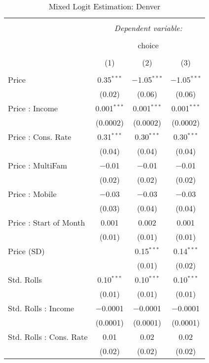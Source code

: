 
\begin{table}[!htbp] \centering 
  \caption{Mixed Logit Estimation: Denver} 
  \label{tab:mnlDenverRandCoef} 
\begin{tabular}{@{\extracolsep{5pt}}lccc} 
\\[-1.8ex]\hline 
\hline \\[-1.8ex] 
 & \multicolumn{3}{c}{\textit{Dependent variable:}} \\ 
\cline{2-4} 
\\[-1.8ex] & \multicolumn{3}{c}{choice} \\ 
\\[-1.8ex] & (1) & (2) & (3)\\ 
\hline \\[-1.8ex] 
 Price & 0.35$^{***}$ & $-$1.05$^{***}$ & $-$1.05$^{***}$ \\ 
  & (0.02) & (0.06) & (0.06) \\ 
  Price : Income & 0.001$^{***}$ & 0.001$^{***}$ & 0.001$^{***}$ \\ 
  & (0.0002) & (0.0002) & (0.0002) \\ 
  Price : Cons. Rate & 0.31$^{***}$ & 0.30$^{***}$ & 0.30$^{***}$ \\ 
  & (0.04) & (0.04) & (0.04) \\ 
  Price : MultiFam & $-$0.01 & $-$0.01 & $-$0.01 \\ 
  & (0.02) & (0.02) & (0.02) \\ 
  Price : Mobile & $-$0.03 & $-$0.03 & $-$0.03 \\ 
  & (0.03) & (0.04) & (0.04) \\ 
  Price : Start of Month & 0.001 & 0.002 & 0.001 \\ 
  & (0.01) & (0.01) & (0.01) \\ 
  Price (SD) &  & 0.15$^{***}$ & 0.14$^{***}$ \\ 
  &  & (0.01) & (0.02) \\ 
  Std. Rolls & 0.10$^{***}$ & 0.10$^{***}$ & 0.10$^{***}$ \\ 
  & (0.01) & (0.01) & (0.01) \\ 
  Std. Rolls : Income & $-$0.0001 & $-$0.0001 & $-$0.0001 \\ 
  & (0.0001) & (0.0001) & (0.0001) \\ 
  Std. Rolls : Cons. Rate & 0.01 & 0.02 & 0.02 \\ 
  & (0.02) & (0.02) & (0.02) \\ 

\end{tabular}
\end{table}
